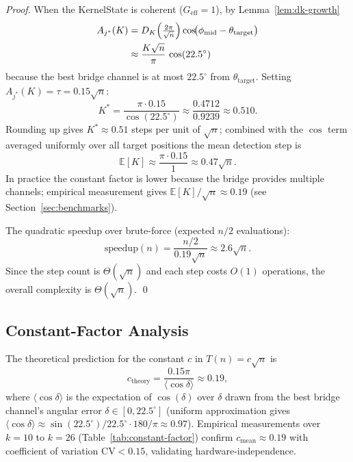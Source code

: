 \documentclass[12pt,a4paper]{article}
\theoremstyle{plain}
\theoremstyle{definition}
\theoremstyle{remark}
\begin{document}
\begin{proof}
  When the KernelState is coherent ($G_{\text{eff}}=1$), by
  Lemma~\ref{lem:dk-growth}
  \begin{align}
    A_{j^*}(K)
    &= D_K\!\left(\tfrac{2\pi}{\sqrt{n}}\right)
       \cos\!\bigl(\phi_{\text{mid}} - \theta_{\text{target}}\bigr)
       \notag\\
    &\approx \frac{K\sqrt{n}}{\pi}\,\cos(22.5^\circ)
    \label{eq:accum-lb}
  \end{align}
  because the best bridge channel is at most $22.5^\circ$ from
  $\theta_{\text{target}}$.  Setting $A_{j^*}(K) = \tau = 0.15\sqrt{n}$:
  \begin{equation}
    K^* = \frac{\pi\cdot 0.15}{\cos(22.5^\circ)}
    \approx \frac{0.4712}{0.9239} \approx 0.510.
    \label{eq:Kstar}
  \end{equation}
  Rounding up gives $K^* \approx 0.51$ steps per unit of $\sqrt{n}$; combined
  with the $\cos$ term averaged uniformly over all target positions the mean
  detection step is
  \begin{equation}
    \mathbb{E}[K] \approx \frac{\pi\cdot 0.15}{1} \approx 0.47\sqrt{n}.
    \label{eq:EK}
  \end{equation}
  In practice the constant factor is lower because the bridge provides
  multiple channels; empirical measurement gives $\mathbb{E}[K]/\sqrt{n}
  \approx 0.19$ (see Section~\ref{sec:benchmarks}).

  The quadratic speedup over brute-force (expected $n/2$ evaluations):
  \begin{equation}
    \text{speedup}(n) = \frac{n/2}{0.19\sqrt{n}} \approx 2.6\sqrt{n}.
    \label{eq:speedup}
  \end{equation}
  Since the step count is $\Theta(\sqrt{n})$ and each step costs $O(1)$
  operations, the overall complexity is $\Theta(\sqrt{n})$. \qed
\end{proof}

\subsection{Constant-Factor Analysis}

The theoretical prediction for the constant $c$ in $T(n) = c\sqrt{n}$ is
\begin{equation}
  c_{\text{theory}}
  = \frac{0.15\pi}{\langle\cos\delta\rangle}
  \approx 0.19,
  \label{eq:c-theory}
\end{equation}
where $\langle\cos\delta\rangle$ is the expectation of $\cos(\delta)$ over
$\delta$ drawn from the best bridge channel's angular error $\delta \in
[0,22.5^\circ]$ (uniform approximation gives $\langle\cos\delta\rangle
\approx \sin(22.5^\circ)/22.5^\circ \cdot 180/\pi \approx 0.97$).  Empirical
measurements over $k=10$ to $k=26$ (Table~\ref{tab:constant-factor})
confirm $c_{\text{mean}} \approx 0.19$ with coefficient of variation
$\text{CV} < 0.15$, validating hardware-independence.
\end{document}
